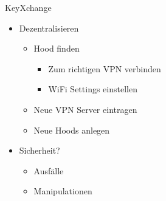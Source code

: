 \begin{frame}{KeyXchange}
    \begin{itemize}
        \item Dezentralisieren
        \begin{itemize}
            \item Hood finden
            \begin{itemize}
                \item Zum richtigen VPN verbinden
                \item WiFi Settings einstellen
            \end{itemize}
            \item Neue VPN Server eintragen
            \item Neue Hoods anlegen
        \end{itemize}
        \item Sicherheit?
        \begin{itemize}
            \item Ausfälle
            \item Manipulationen
        \end{itemize}
    \end{itemize}
\end{frame}

